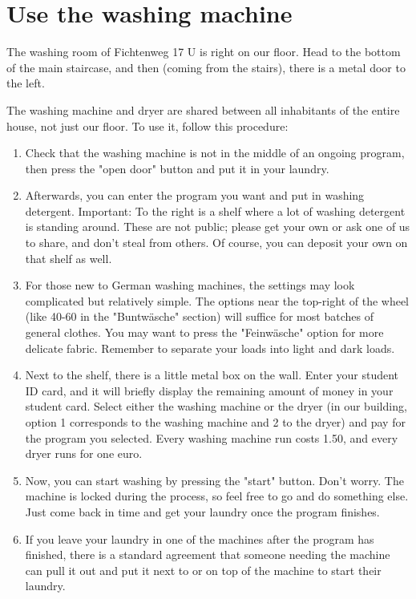 \section{Use the washing machine} \label{sec:qna-washing-machine}
The washing room of Fichtenweg 17 U is right on our floor. Head to the bottom of the main staircase, and then (coming from the stairs), there is a metal door to the left.

The washing machine and dryer are shared between all inhabitants of the entire house, not just our floor. To use it, follow this procedure:
\begin{enumerate}
    \item Check that the washing machine is not in the middle of an ongoing program, then press the "open door" button and put it in your laundry.
    
    \item Afterwards, you can enter the program you want and put in washing detergent. Important: To the right is a shelf where a lot of washing detergent is standing around. These are not public; please get your own or ask one of us to share, and don't steal from others. Of course, you can deposit your own on that shelf as well. 
    
    \item For those new to German washing machines, the settings may look complicated but relatively simple. The options near the top-right of the wheel (like 40-60 in the "Buntwäsche" section) will suffice for most batches of general clothes. You may want to press the "Feinwäsche" option for more delicate fabric. Remember to separate your loads into light and dark loads.
    
    \item Next to the shelf, there is a little metal box on the wall. Enter your student ID card, and it will briefly display the remaining amount of money in your student card. Select either the washing machine or the dryer (in our building, option 1 corresponds to the washing machine and 2 to the dryer) and pay for the program you selected. Every washing machine run costs 1.50, and every dryer runs for one euro.
    
    \item Now, you can start washing by pressing the "start" button. Don't worry. The machine is locked during the process, so feel free to go and do something else. Just come back in time and get your laundry once the program finishes.
    
    \item If you leave your laundry in one of the machines after the program has finished, there is a standard agreement that someone needing the machine can pull it out and put it next to or on top of the machine to start their laundry.


\end{enumerate}
